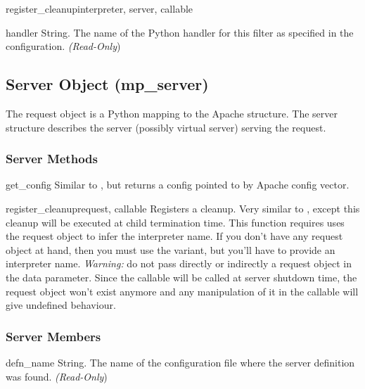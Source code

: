 \begin{funcdesc}{register_cleanup}{interpreter, server, callable}
\begin{memberdesc}[filter]{handler}
  String. The name of the Python handler for this filter as specified in
  the configuration. 
  \emph{(Read-Only})
\end{memberdesc}

\subsection{Server Object (mp_server)\label{pyapi-mpserver}}

The request object is a Python mapping to the Apache 
structure. The server structure describes the server (possibly virtual
server) serving the request.

\subsubsection{Server Methods\label{pyapi-mpsrv-meth}}

\begin{methoddesc}[server]{get_config}{}
  Similar to , but returns a config pointed to
  by  Apache config vector. 
\end{methoddesc}

\begin{methoddesc}[server]{register_cleanup}{request, callable}
  Registers a cleanup. Very similar to , except
  this cleanup will be executed at child termination time. This function
  requires uses the request object to infer the interpreter name.
  If you don't have any request object at hand, then you must use the
   variant, but you'll have to provide an
  interpreter name.
  \emph{Warning:} do not pass directly or indirectly a request object in the
  data parameter. Since the callable will be called at server shutdown time,
  the request object won't exist anymore and any manipulation of it in the
  callable will give undefined behaviour.
\end{methoddesc}

\subsubsection{Server Members\label{pyapi-mpsrv-mem}}

\begin{memberdesc}[server]{defn_name}
  String. The name of the configuration file where the server definition
  was found.
  \emph{(Read-Only})
\end{memberdesc}


\end{funcdesc}
